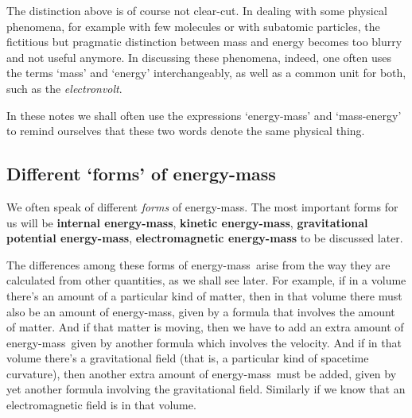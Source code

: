 \documentclass[a4paper,12pt,%
onecolumn,oneside,%
british%
]{memoir}
\providecommand{\href}[2]{#2}
\renewcommand*{\|}[1][]{\nonscript\:#1\vert\nonscript\:\mathopen{}}
\newcommand*{\furl}[2]{\href{#1}{#2}\pagenote{\url{#1}}}
\newcommand*{\energym}{energy-mass}
\newcommand*{\masse}{mass-energy}
\begin{document}
\medskip

The distinction above is of course not clear-cut. In dealing with some physical phenomena, for example with few molecules or with subatomic particles, the fictitious but pragmatic distinction between mass and energy becomes too blurry and not useful anymore. In discussing these phenomena, indeed, one often uses the terms \enquote*{mass} and \enquote*{energy} interchangeably, as well as a common unit for both, such as the \furl{https://home.cern/tags/13-tev}{\emph{electronvolt}}.

\medskip

In these notes we shall often use the expressions \enquote*{\energym} and \enquote*{\masse} to remind ourselves that these two words denote the same physical thing.

\subsection{Different \enquote*{forms} of \energym}
\label{sec:forms_energy}

We often speak of different \emph{forms} of \energym. The most important forms for us will be \textbf{internal \energym}, \textbf{kinetic \energym}, \textbf{gravitational potential \energym}, \textbf{electromagnetic \energym} to be discussed later.

The differences among these forms of \energym\ arise from the way they are calculated from other quantities, as we shall see later. For example, if in a volume there's an amount of a particular kind of matter, then in that volume there must also be an amount of \energym, given by a formula that involves the amount of matter. And if that matter is moving, then we have to add an extra amount of \energym\ given by another formula which involves the velocity. And if in that volume there's a gravitational field (that is, a particular kind of spacetime curvature), then another extra amount of \energym\ must be added, given by yet another formula involving the gravitational field. Similarly if we know that an electromagnetic field is in that volume.
\end{document}

